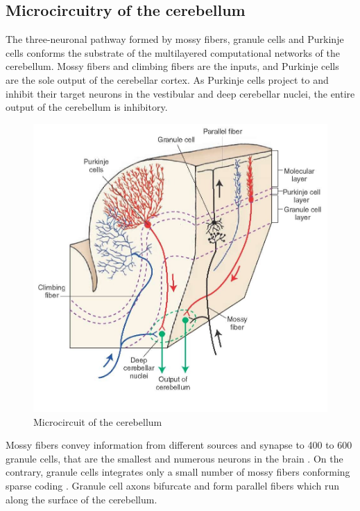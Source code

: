 \documentclass[12pt, a4paper,twoside]{tesi_upf}
\begin{document}
\subsection{Microcircuitry of the cerebellum}

The three-neuronal pathway formed by mossy fibers, granule cells and Purkinje cells conforms the substrate of the multilayered computational networks of the cerebellum. Mossy fibers and climbing fibers are the inputs, and Purkinje cells are the sole output of the cerebellar cortex. As Purkinje cells project to and inhibit their target neurons in the vestibular and deep cerebellar nuclei, the entire output of the cerebellum is inhibitory.

\begin{figure}
  \centering
  \includegraphics[scale=1]{images/circuit.jpg}
  \caption[Microcircuit of the cerebellum]{Microcircuit of the cerebellum}
\end{figure}

Mossy fibers convey information from different sources and synapse to 400 to 600 granule cells, that are the smallest and numerous neurons in the brain \cite{Marr1969}. On the contrary, granule cells integrates only a small number of mossy fibers conforming sparse coding \cite{Ito2006}. Granule cell axons bifurcate and form parallel fibers which run along the surface of the cerebellum.
\end{document}
